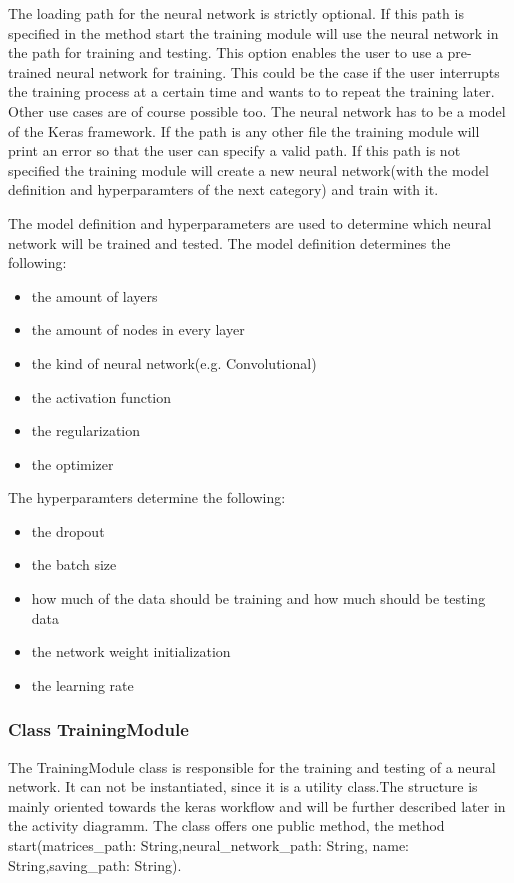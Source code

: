 \documentclass[parskip=full]{scrartcl}
\begin{document}
The loading path for the \gls{neural network} is strictly optional.
If this path is specified in the method start the training module will use the \gls{neural network} in the path for training and testing.
This option enables the user to use a pre-trained \gls{neural network} for training.
This could be the case if the user interrupts the training process at a certain time and wants to to repeat the training later.
Other use cases are of course possible too.
The \gls{neural network} has to be a model of the Keras framework.
If the path is any other file the training module will print an error so that the user can specify a valid path.
If this path is not specified the training module will create a new \gls{neural network}(with the model definition and hyperparamters of the next category) and train with it. \newline

The model definition and hyperparameters are used to determine which \gls{neural network} will be trained and tested.
The model definition determines the following:
\begin{itemize}
\item the amount of layers
\item the amount of nodes in every layer
\item the kind of \gls{neural network}(e.g. Convolutional)
\item the activation function
\item the regularization
\item the optimizer
\end{itemize}

The hyperparamters determine the following:

\begin{itemize}
\item the dropout
\item the batch size
\item how much of the data should be training and how much should be testing data
\item the network weight initialization
\item the learning rate
\end{itemize}

\subsubsection{Class TrainingModule}
The TrainingModule class is responsible for the training and testing of a \gls{neural network}.
It can not be instantiated, since it is a utility class.The structure is mainly oriented towards the keras workflow and will be further described later in the activity diagramm.
The class offers one public method, the method start(matrices\_path: String,neural\_network\_path: String,
name: String,saving\_path: String). \newline
\end{document}
